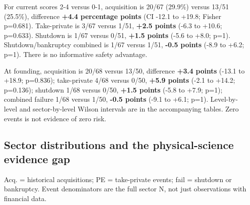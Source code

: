 For current scores 2-4 versus 0-1, acquisition is 20/67 (29.9\%) versus
13/51 (25.5\%), difference \textbf{+4.4 percentage points} (CI -12.1 to
+19.8; Fisher p=0.681). Take-private is 3/67 versus 1/51, \textbf{+2.5
points} (-6.3 to +10.6; p=0.633). Shutdown is 1/67 versus 0/51,
\textbf{+1.5 points} (-5.6 to +8.0; p=1). Shutdown/bankruptcy combined
is 1/67 versus 1/51, \textbf{-0.5 points} (-8.9 to +6.2; p=1). There is
no informative safety advantage.

At founding, acquisition is 20/68 versus 13/50, difference \textbf{+3.4
points} (-13.1 to +18.9; p=0.836); take-private 4/68 versus 0/50,
\textbf{+5.9 points} (-2.1 to +14.2; p=0.136); shutdown 1/68 versus
0/50, \textbf{+1.5 points} (-5.8 to +7.9; p=1); combined failure 1/68
versus 1/50, \textbf{-0.5 points} (-9.1 to +6.1; p=1). Level-by-level
and sector-by-level Wilson intervals are in the accompanying tables.
Zero events is not evidence of zero risk.

\subsection{Sector distributions and the physical-science evidence
gap}\label{sector-distributions-and-the-physical-science-evidence-gap}

Acq. = historical acquisitions; PE = take-private events; fail =
shutdown or bankruptcy. Event denominators are the full sector N, not
just observations with financial data.

